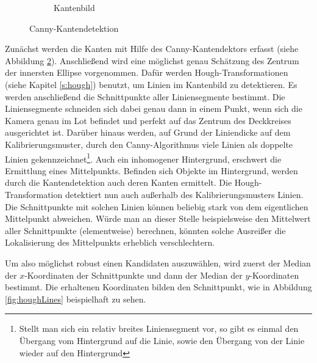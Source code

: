 \begin{figure}[!htb]
\begin{subfigure}{.5\textwidth}
		\caption{Kantenbild}
		\label{fig:afterCanny}
	\end{subfigure}
	\caption{Canny-Kantendetektion}
	\label{fig:canny}
\end{figure}

Zunächst werden die Kanten mit Hilfe des Canny-Kantendektors \cite{Canny1986} erfasst (siehe Abbildung \ref{fig:canny}).
Anschließend wird eine möglichst genau Schätzung des Zentrum der innersten Ellipse vorgenommen.
Dafür werden Hough-Transformationen (siehe Kapitel \ref{s:hough}) benutzt, um Linien im Kantenbild zu detektieren.
Es werden anschließend die Schnittpunkte aller Liniensegmente bestimmt. 
Die Liniensegmente schneiden sich dabei genau dann in einem Punkt, wenn sich die Kamera genau im Lot befindet und perfekt auf das Zentrum des Deckkreises ausgerichtet ist.
Darüber hinaus werden, auf Grund der Liniendicke auf dem Kalibrierungsmuster, durch den Canny-Algorithmus viele Linien als doppelte Linien gekennzeichnet\footnote{Stellt man sich ein relativ breites Liniensegment vor, so gibt es einmal den Übergang vom Hintergrund auf die Linie, sowie den Übergang von der Linie wieder auf den Hintergrund}. Auch ein inhomogener Hintergrund, erschwert die Ermittlung eines Mittelpunkts. Befinden sich Objekte im Hintergrund, werden durch die Kantendetektion auch deren Kanten ermittelt. Die Hough-Transformation detektiert nun auch außerhalb des Kalibrierungsmusters Linien. Die Schnittpunkte mit solchen Linien können beliebig stark von dem eigentlichen Mittelpunkt abweichen. Würde man an dieser Stelle beispielsweise den Mittelwert aller Schnittpunkte (elementweise) berechnen, könnten solche Ausreißer die Lokalisierung des Mittelpunkts erheblich verschlechtern.

Um also möglichst robust einen Kandidaten auszuwählen, wird zuerst der Median der $x$-Koordinaten der Schnittpunkte und dann der Median der $y$-Koordinaten bestimmt. Die erhaltenen Koordinaten bilden den Schnittpunkt, wie in Abbildung \ref{fig:houghLines} beispielhaft zu sehen.


